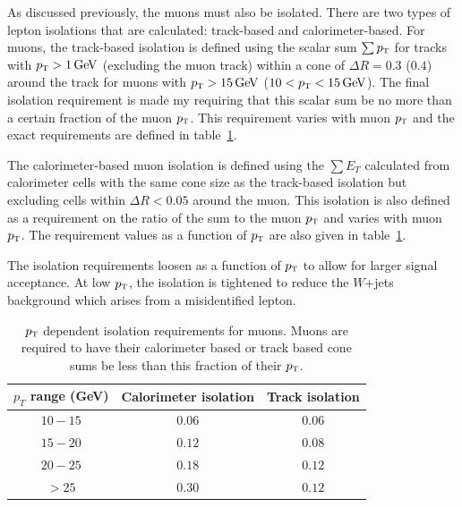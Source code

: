 As discussed previously, the muons must also be isolated. There are two types of lepton isolations that are calculated: track-based and calorimeter-based. For muons, the track-based isolation is defined using the scalar sum  $\sum p_{\textrm{\footnotesize\sc t}}$ for tracks with $\pT > 1 \GeV$ (excluding the muon track) within a cone of  $\Delta R = 0.3$ ($0.4$) around the track for muons with $\pT > 15 \GeV$ ($10 < \pT < 15 \GeV$). The final isolation requirement is made my requiring that this scalar sum be no more than a certain fraction of the muon $p_{\textrm{\footnotesize\sc t}}$. This requirement varies with muon $p_{\textrm{\footnotesize\sc t}}$ and the exact requirements are defined in table~\ref{tab:muonisocuts}.

The calorimeter-based muon isolation is defined using the $\sum E_{T}$ calculated from calorimeter cells with the same cone size as the track-based isolation but excluding cells within $\Delta R < 0.05$ around the muon. This isolation is also defined as a requirement on the ratio of the sum to the muon $p_{\textrm{\footnotesize\sc t}}$ and varies with muon $p_{\textrm{\footnotesize\sc t}}$. The requirement values as a function of $p_{\textrm{\footnotesize\sc t}}$ are also given in table~\ref{tab:muonisocuts}.

The isolation requirements loosen as a function of $p_{\textrm{\footnotesize\sc t}}$ to allow for larger signal acceptance. At low $p_{\textrm{\footnotesize\sc t}}$, the isolation is tightened to reduce the $W$+jets background which arises from a misidentified lepton. 

\begin{table}[h!]
\centering
\captionsetup{justification=centering}

\hspace{-10pt}
\begin{tabular}{|c|c|c|}
\hline
$p_T$ range (GeV) & Calorimeter isolation & Track isolation\\ \hline \hline
$10-15$ & $0.06$ & $0.06$ \\ \hline
$15-20$ & $0.12$ & $0.08$ \\ \hline
$20-25$ & $0.18$ & $0.12$ \\ \hline
$> 25$ & $0.30$ & $0.12$ \\ \hline
\end{tabular}

\caption{
$p_{\textrm{\footnotesize\sc t}}$ dependent isolation requirements for muons. Muons are required to have their calorimeter based or track based cone sums be less than this fraction of their $p_{\textrm{\footnotesize\sc t}}$.
}
\label{tab:muonisocuts}
\end{table}

